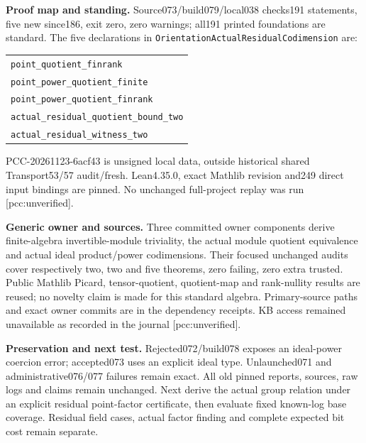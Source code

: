 \documentclass[11pt]{article}
\begin{document}
\textbf{Proof map and standing.}
Source073/build079/local038 checks191 statements, five new since186, exit zero,
zero warnings; all191 printed foundations are standard. The five declarations
in \texttt{OrientationActualResidualCodimension} are:
\begin{center}\begin{tabular}{l}
\texttt{point\_quotient\_finrank}\\
\texttt{point\_power\_quotient\_finite}\\
\texttt{point\_power\_quotient\_finrank}\\
\texttt{actual\_residual\_quotient\_bound\_two}\\
\texttt{actual\_residual\_witness\_two}
\end{tabular}\end{center}
PCC-20261123-6acf43 is unsigned local data, outside historical shared
Transport53/57 audit/fresh. Lean4.35.0, exact Mathlib revision and249 direct
input bindings are pinned. No unchanged full-project replay was run
[pcc:unverified].

\textbf{Generic owner and sources.}
Three committed owner components derive finite-algebra invertible-module
triviality, the actual module quotient equivalence and actual ideal product/power
codimensions. Their focused unchanged audits cover respectively two, two and
five theorems, zero failing, zero extra trusted. Public Mathlib Picard,
tensor-quotient, quotient-map and rank-nullity results are reused; no novelty
claim is made for this standard algebra. Primary-source paths and exact owner
commits are in the dependency receipts. KB access remained unavailable as
recorded in the journal [pcc:unverified].

\textbf{Preservation and next test.}
Rejected072/build078 exposes an ideal-power coercion error; accepted073 uses
an explicit ideal type. Unlaunched071 and administrative076/077 failures remain
exact. All old pinned reports, sources, raw logs and claims remain unchanged.
Next derive the actual group relation under an explicit residual point-factor
certificate, then evaluate fixed known-log base coverage. Residual field cases,
actual factor finding and complete expected bit cost remain separate.
\end{document}
